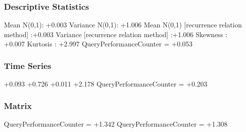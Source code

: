 \documentclass[9pt]{article}
\theoremstyle{plain}
\theoremstyle{definition}
\theoremstyle{remark}
\numberwithin{equation}{section}
\begin{document}
\subsubsection{Descriptive Statistics}
Mean N(0,1): +0.003
Variance N(0,1): +1.006
Mean N(0,1) [recurrence relation method] :+0.003
Variance [recurrence relation method] :+1.006
Skewness : +0.007
Kurtosis : +2.997
QueryPerformanceCounter  =  +0.053
\subsubsection{Time Series }
+0.093
+0.726
+0.011
+2.178
QueryPerformanceCounter  =  +0.203
\subsubsection{Matrix}
QueryPerformanceCounter  =  +1.342
QueryPerformanceCounter  =  +1.308
\end{document}
